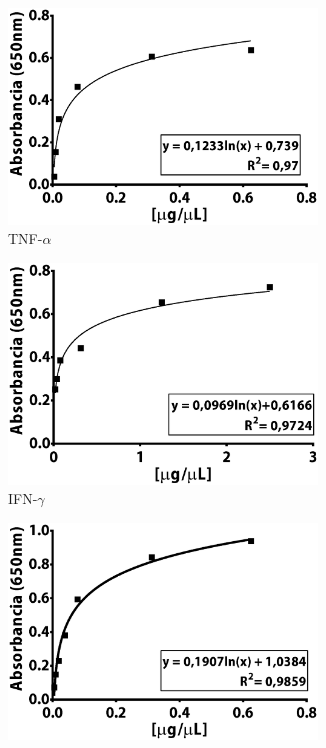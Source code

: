\documentclass[12pt,letterpaper,oneside]{scrbook}
\begin{document}
\begin{figure}[h]
    \begin{subfigure}{0.5\textwidth}
        \includegraphics[width=0.9\textwidth]{peptidos/tnfa}
        \caption{TNF-$\alpha$}
        \label{fig:pep:tnfa}
        \end{subfigure}
    \begin{subfigure}{0.5\textwidth}
        \includegraphics[width=0.9\textwidth]{peptidos/ifng}
        \caption{IFN-$\gamma$}
        \label{fig:pep:ifng}
    \end{subfigure}
      \begin{subfigure}{0.5\textwidth}
        \includegraphics[width=0.9\textwidth]{peptidos/il1b}

\end{subfigure}
\end{figure}
\end{document}
